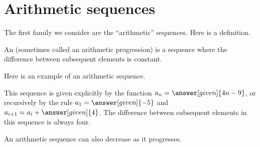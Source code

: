 \documentclass{ximera}
\begin{document}
\section{Arithmetic sequences}


The first family we consider are the ``arithmetic'' sequences.  Here
is a definition.


\begin{definition}
  An  (sometimes called an arithmetic
  progression) is a sequence where the
  difference between subsequent elements is constant.
\end{definition}


\begin{example}
  Here is an example of an arithmetic sequence.
  \begin{image}
  \end{image}
  This sequence is given explicitly by the function $a_n=\answer[given]{4n-9}$,
  or recursively by the rule $a_1 = \answer[given]{-5}$ and $a_{i+1} = a_i
  + \answer[given]{4}$. The difference between subsequent elements in this sequence is always four.
\end{example}

An arithmetic sequence can also decrease as it progresses.
\end{document}
